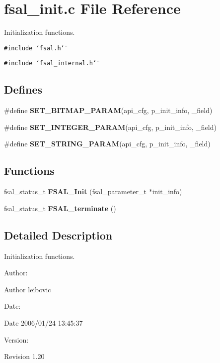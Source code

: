 \section{fsal\_\-init.c File Reference}
\label{fsal__init_8c}
Initialization functions.  


{\tt \#include \char`\"{}fsal.h\char`\"{}}\par
{\tt \#include \char`\"{}fsal\_\-internal.h\char`\"{}}\par
\subsection*{Defines}
\begin{CompactItemize}
\item 
\#define \textbf{SET\_\-BITMAP\_\-PARAM}(api\_\-cfg, p\_\-init\_\-info, \_\-field)
\item 
\#define \textbf{SET\_\-INTEGER\_\-PARAM}(api\_\-cfg, p\_\-init\_\-info, \_\-field)
\item 
\#define \textbf{SET\_\-STRING\_\-PARAM}(api\_\-cfg, p\_\-init\_\-info, \_\-field)
\end{CompactItemize}
\subsection*{Functions}
\begin{CompactItemize}
\item 
fsal\_\-status\_\-t {\bf FSAL\_\-Init} (fsal\_\-parameter\_\-t $\ast$init\_\-info)
\item 
fsal\_\-status\_\-t \textbf{FSAL\_\-terminate} ()\label{fsal__init_8c_dabe2f2fc596731b07948fb0f9ae51db}

\end{CompactItemize}


\subsection{Detailed Description}
Initialization functions. 

\begin{Desc}
\item[Author:]\end{Desc}
\begin{Desc}
\item[Author]leibovic \end{Desc}
\begin{Desc}
\item[Date:]\end{Desc}
\begin{Desc}
\item[Date]2006/01/24 13:45:37 \end{Desc}
\begin{Desc}
\item[Version:]\end{Desc}
\begin{Desc}
\item[Revision]1.20 \end{Desc}


